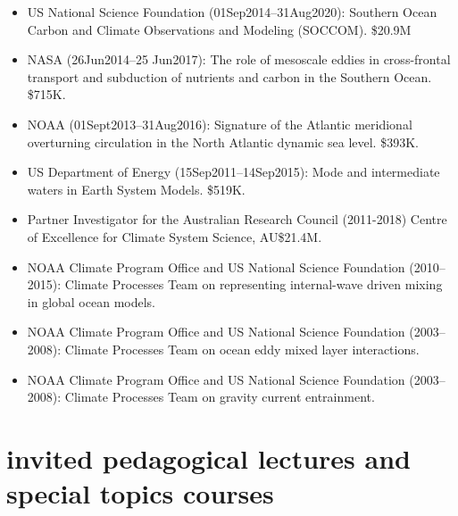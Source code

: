 \documentclass{article}
\begin{document}
\begin{itemize}[leftmargin=*]
\item US National Science Foundation (01Sep2014--31Aug2020): Southern Ocean Carbon and Climate Observations and Modeling
(SOCCOM). \$20.9M

\item NASA (26Jun2014--25 Jun2017): The role of mesoscale eddies in cross-frontal transport and subduction of nutrients and carbon in
  the Southern Ocean.  \$715K.

\item NOAA (01Sept2013--31Aug2016): Signature of the Atlantic meridional overturning circulation in the North Atlantic dynamic sea
  level.  \$393K.

\item US Department of Energy (15Sep2011--14Sep2015): Mode and intermediate waters in Earth System Models. \$519K.

\item Partner Investigator for the Australian Research Council (2011-2018) Centre of Excellence for Climate System Science, AU\$21.4M.
  
\item NOAA Climate Program Office and US National Science Foundation (2010--2015): Climate Processes Team on representing internal-wave driven mixing in global ocean models.

\item NOAA Climate Program Office and US National Science Foundation (2003--2008): Climate Processes Team on ocean eddy mixed layer interactions.

\item NOAA Climate Program Office and US National Science Foundation (2003--2008): Climate Processes Team on gravity current entrainment.



\end{itemize}


\section*{\sc  \color{Maroon}  invited pedagogical lectures and special topics courses}
\vspace{-.3cm}
\end{document}
